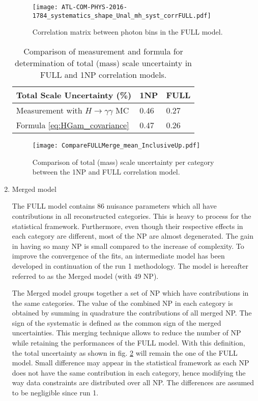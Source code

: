 \begin{enumerate}
\begin{figure}[htbp]
\centering
\texttt{[image: ATL-COM-PHYS-2016-1784\_systematics\_shape\_Unal\_mh\_syst\_corrFULL.pdf]}
\caption{\label{fig:orgc8a0af2}
Correlation matrix between photon bins in the FULL model.}
\end{figure}


\begin{table}[h!]
\centering
\begin{tabular}{l|ll}
Total Scale Uncertainty (\%) & 1NP & FULL \\
\hline
Measurement with $H\rightarrow\gamma\gamma$ MC & 0.46 & 0.27\\
Formula \ref{eq:HGam_covariance} & 0.47 & 0.26\\
\end{tabular}
\caption{Comparison of measurement and formula for determination of total (mass) scale uncertainty in FULL and 1NP correlation models. }
\label{tab:systematics_shape_totSystTheo}
\end{table}


\begin{figure}[htbp]
\centering
\texttt{[image: CompareFULLMerge\_mean\_InclusiveUp.pdf]}
\caption{\label{fig:orgc654f3f}
Comparison of total (mass) scale uncertainty per category between the 1NP and FULL correlation model.}
\end{figure}



\item Merged model
\label{sec:org545da70}

The FULL model contains 86 nuisance parameters which all have contributions in all reconstructed categories.
This is heavy to process for the statistical framework.
Furthermore, even though their respective effects in each category are different, most of the NP are almost degenerated.
The gain in having so many NP is small compared to the increase of complexity.
To improve the convergence of the fits, an intermediate model has been developed in continuation of the run 1 methodology\cite{ATL-COM-PHYS-2014-018,CERN-PH-EP-2014-122}.
The model is hereafter referred to as the Merged model (with 49 NP).

The Merged model groups together a set of NP which have contributions in the same categories.
The value of the combined NP in each category  is obtained by summing in quadrature the contributions of all merged NP.
The sign of the systematic is defined as the common sign of the merged uncertainties.
This merging technique allows to reduce the number of NP while retaining the performances of the FULL model.
With this definition, the total uncertainty as shown in fig. \ref{fig:orgc654f3f} will remain the one of the FULL model.
Small difference may appear in the statistical framework as each NP does not have the same contribution in each category, hence modifying the way data constraints are distributed over all NP.
The differences are assumed to be negligible since run 1.


\end{enumerate}
